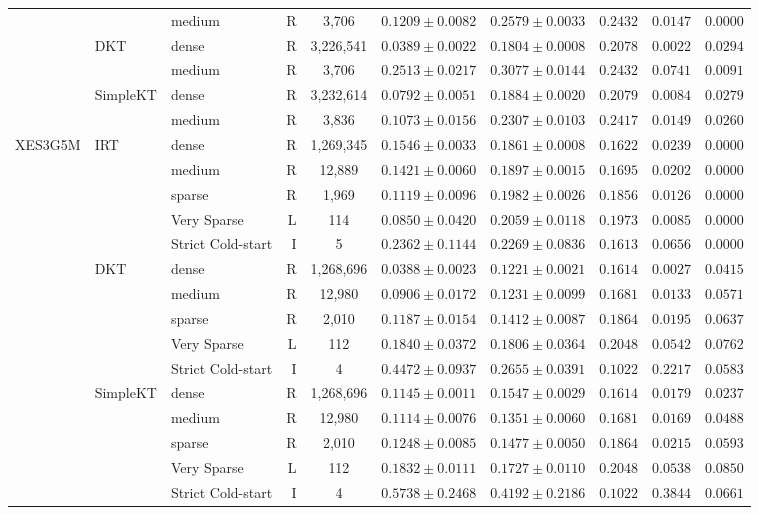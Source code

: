 \begin{table}[htbp]
{\begin{tabular}{lllrcccccc}
 &  & medium & R & 3,706 & $0.1209 \pm 0.0082$ & $0.2579 \pm 0.0033$ & $0.2432$ & $0.0147$ & $0.0000$ \\
 & DKT & dense & R & 3,226,541 & $0.0389 \pm 0.0022$ & $0.1804 \pm 0.0008$ & $0.2078$ & $0.0022$ & $0.0294$ \\
 &  & medium & R & 3,706 & $0.2513 \pm 0.0217$ & $0.3077 \pm 0.0144$ & $0.2432$ & $0.0741$ & $0.0091$ \\
 & SimpleKT & dense & R & 3,232,614 & $0.0792 \pm 0.0051$ & $0.1884 \pm 0.0020$ & $0.2079$ & $0.0084$ & $0.0279$ \\
 &  & medium & R & 3,836 & $0.1073 \pm 0.0156$ & $0.2307 \pm 0.0103$ & $0.2417$ & $0.0149$ & $0.0260$ \\
\midrule
XES3G5M & IRT & dense & R & 1,269,345 & $0.1546 \pm 0.0033$ & $0.1861 \pm 0.0008$ & $0.1622$ & $0.0239$ & $0.0000$ \\
 &  & medium & R & 12,889 & $0.1421 \pm 0.0060$ & $0.1897 \pm 0.0015$ & $0.1695$ & $0.0202$ & $0.0000$ \\
 &  & sparse & R & 1,969 & $0.1119 \pm 0.0096$ & $0.1982 \pm 0.0026$ & $0.1856$ & $0.0126$ & $0.0000$ \\
 &  & Very Sparse & L & 114 & $0.0850 \pm 0.0420$ & $0.2059 \pm 0.0118$ & $0.1973$ & $0.0085$ & $0.0000$ \\
 &  & Strict Cold-start & I & 5 & $0.2362 \pm 0.1144$ & $0.2269 \pm 0.0836$ & $0.1613$ & $0.0656$ & $0.0000$ \\
 & DKT & dense & R & 1,268,696 & $0.0388 \pm 0.0023$ & $0.1221 \pm 0.0021$ & $0.1614$ & $0.0027$ & $0.0415$ \\
 &  & medium & R & 12,980 & $0.0906 \pm 0.0172$ & $0.1231 \pm 0.0099$ & $0.1681$ & $0.0133$ & $0.0571$ \\
 &  & sparse & R & 2,010 & $0.1187 \pm 0.0154$ & $0.1412 \pm 0.0087$ & $0.1864$ & $0.0195$ & $0.0637$ \\
 &  & Very Sparse & L & 112 & $0.1840 \pm 0.0372$ & $0.1806 \pm 0.0364$ & $0.2048$ & $0.0542$ & $0.0762$ \\
 &  & Strict Cold-start & I & 4 & $0.4472 \pm 0.0937$ & $0.2655 \pm 0.0391$ & $0.1022$ & $0.2217$ & $0.0583$ \\
 & SimpleKT & dense & R & 1,268,696 & $0.1145 \pm 0.0011$ & $0.1547 \pm 0.0029$ & $0.1614$ & $0.0179$ & $0.0237$ \\
 &  & medium & R & 12,980 & $0.1114 \pm 0.0076$ & $0.1351 \pm 0.0060$ & $0.1681$ & $0.0169$ & $0.0488$ \\
 &  & sparse & R & 2,010 & $0.1248 \pm 0.0085$ & $0.1477 \pm 0.0050$ & $0.1864$ & $0.0215$ & $0.0593$ \\
 &  & Very Sparse & L & 112 & $0.1832 \pm 0.0111$ & $0.1727 \pm 0.0110$ & $0.2048$ & $0.0538$ & $0.0850$ \\
 &  & Strict Cold-start & I & 4 & $0.5738 \pm 0.2468$ & $0.4192 \pm 0.2186$ & $0.1022$ & $0.3844$ & $0.0661$ \\
\bottomrule


\end{tabular}}
\end{table}
